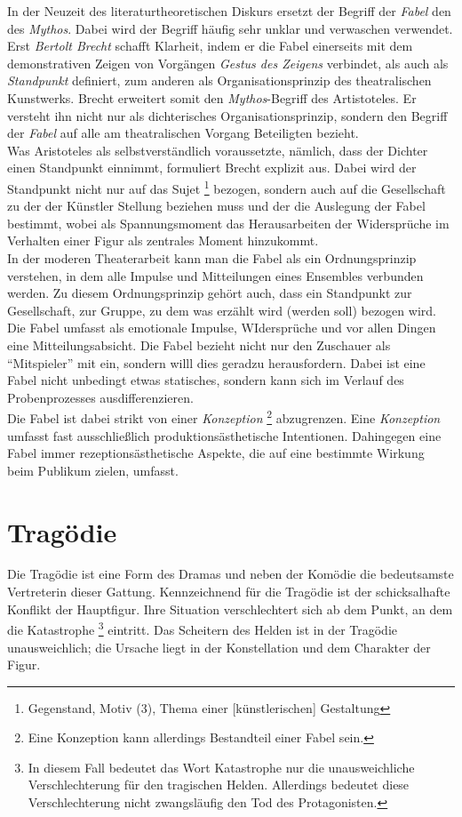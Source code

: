 \documentclass[ngerman, a4paper, twoside]{scrbook}%
\begin{document}
	In der Neuzeit des literaturtheoretischen Diskurs ersetzt der Begriff der \emph{Fabel} den des \emph{Mythos}. Dabei wird der Begriff häufig sehr unklar und verwaschen verwendet. Erst \emph{Bertolt Brecht} schafft Klarheit, indem er die Fabel einerseits mit dem demonstrativen Zeigen von Vorgängen \emph{Gestus des Zeigens} verbindet, als auch als \emph{Standpunkt} definiert, zum anderen als Organisationsprinzip des theatralischen Kunstwerks. Brecht erweitert somit den \emph{Mythos}-Begriff des Artistoteles. Er versteht ihn nicht nur als dichterisches Organisationsprinzip, sondern den Begriff der \emph{Fabel} auf alle am theatralischen Vorgang Beteiligten bezieht.\\

	Was Aristoteles als selbstverständlich voraussetzte, nämlich, dass der Dichter einen Standpunkt einnimmt, formuliert Brecht explizit aus. Dabei wird der Standpunkt nicht nur auf das Sujet
	\footnote{Gegenstand, Motiv (3), Thema einer [künstlerischen] Gestaltung}
	bezogen, sondern auch auf die Gesellschaft zu der der Künstler Stellung beziehen muss und der die Auslegung der Fabel bestimmt, wobei als Spannungsmoment das Herausarbeiten der Widersprüche im Verhalten einer Figur als zentrales Moment hinzukommt.\\

	In der moderen Theaterarbeit kann man die Fabel als ein Ordnungsprinzip verstehen, in dem alle Impulse und Mitteilungen eines Ensembles verbunden werden. Zu diesem Ordnungsprinzip gehört auch, dass ein Standpunkt zur Gesellschaft, zur Gruppe, zu dem was erzählt wird (werden soll) bezogen wird. Die Fabel umfasst als emotionale Impulse, WIdersprüche und vor allen Dingen eine Mitteilungsabsicht. Die Fabel bezieht nicht nur den Zuschauer als "`Mitspieler"' mit ein, sondern willl dies geradzu herausfordern. Dabei ist eine Fabel nicht unbedingt etwas statisches, sondern kann sich im Verlauf des Probenprozesses ausdifferenzieren.\\

	Die Fabel ist dabei strikt von einer \emph{Konzeption}
	\footnote{Eine Konzeption kann allerdings Bestandteil einer Fabel sein.}
	abzugrenzen. Eine \emph{Konzeption} umfasst fast ausschließlich produktionsästhetische Intentionen. Dahingegen eine Fabel immer rezeptionsästhetische Aspekte, die auf eine bestimmte Wirkung beim Publikum zielen, umfasst.

	\section{Tragödie}
	Die Tragödie ist eine Form des Dramas und neben der Komödie die bedeutsamste Vertreterin dieser Gattung. Kennzeichnend für die Tragödie ist der schicksalhafte Konflikt der Hauptfigur. Ihre Situation verschlechtert sich ab dem Punkt, an dem die Katastrophe
	\footnote{In diesem Fall bedeutet das Wort Katastrophe nur die unausweichliche Verschlechterung für den tragischen Helden. Allerdings bedeutet diese Verschlechterung nicht zwangsläufig den Tod des Protagonisten.}
	eintritt. Das Scheitern des Helden ist in der Tragödie unausweichlich; die Ursache liegt in der Konstellation und dem Charakter der Figur.\\
\end{document}
